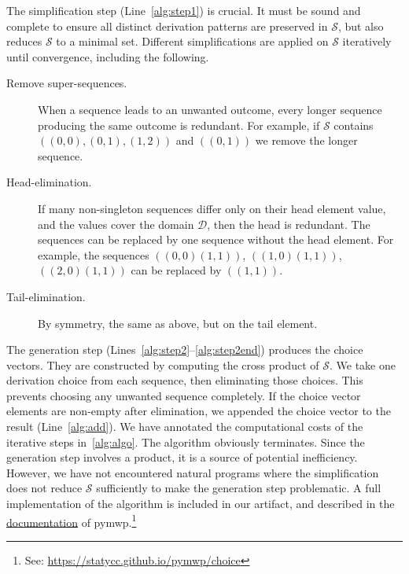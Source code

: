 The simplification step (Line~\ref{alg:step1}) is crucial.
It must be sound and complete to ensure all distinct derivation patterns are preserved in \(\mathcal{S}\),
but also reduces \(\mathcal{S}\) to a minimal set. %
Different simplifications are applied on \(\mathcal{S}\) iteratively until convergence, including the following.

\begin{description}

    \item[Remove super-sequences.] When a sequence leads to an unwanted outcome, every longer sequence producing the same outcome is redundant.
    For example, if \(\mathcal{S}\) contains \(((0,0),(0,1),(1,2))\) and \(((0,1))\) we remove the longer sequence.

    \item[Head-elimination.] If many non-singleton sequences differ only on their head element value, and the values cover the domain \(\mathcal{D}\), then the head is redundant.
    The sequences can be replaced by one sequence without the head element.
    For example, the sequences \(((0,0)(1,1))\), \(((1,0)(1,1))\), \(((2,0)(1,1))\) can be replaced by \(((1,1))\).

    \item[Tail-elimination.] By symmetry, the same as above, but on the tail element.

\end{description}

The generation step (Lines~\ref{alg:step2}--\ref{alg:step2end}) produces the choice vectors.
They are constructed by computing the cross product of \(\mathcal{S}\).
We take one derivation choice from each sequence, then eliminating those choices.
This prevents choosing any unwanted sequence completely.
If the choice vector elements are non-empty after elimination, we appended the choice vector to the result (Line~\ref{alg:add}).
We have annotated the computational costs of the iterative steps in~\autoref{alg:algo}.
The algorithm obviously terminates.
Since the generation step involves a product, it is a source of potential inefficiency.
However, we have not encountered natural programs where the simplification does not reduce \(\mathcal{S}\) sufficiently to make the generation step problematic.
A full implementation of the algorithm is included in our artifact, and described in the \href{https://statycc.github.io/pymwp/choice}{documentation} of pymwp.\footnote{See: \url{https://statycc.github.io/pymwp/choice}}

